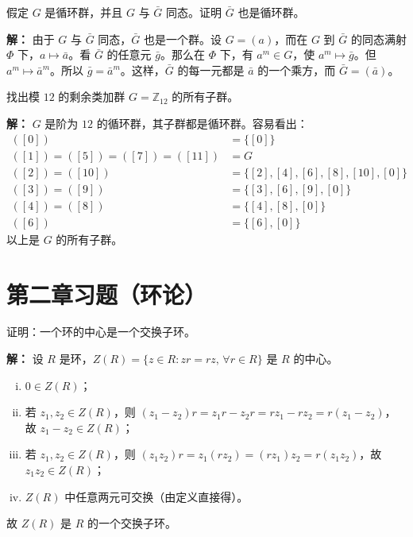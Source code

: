 \begin{example}[循环群的同态像也是循环群]
假定 $G$ 是循环群，并且 $G$ 与 $\bar{G}$ 同态。证明 $\bar{G}$ 也是循环群。

\textbf{解：} 由于 $G$ 与 $\bar{G}$ 同态，$\bar{G}$ 也是一个群。设 $G=(a)$，而在 $G$ 到 $\bar{G}$ 的同态满射 $\Phi$ 下，$a\longmapsto\bar{a}$。看 $\bar{G}$ 的任意元 $\bar{g}$。那么在 $\Phi$ 下，有 $a^m\in G$，使 $a^m\longmapsto\bar{g}$。但 $a^m\longmapsto\bar{a}^m$。所以 $\bar{g}=\bar{a}^m$。这样，$\bar{G}$ 的每一元都是 $\bar{a}$ 的一个乘方，而 $\bar{G}=(\bar{a})$。
\end{example}

\begin{example}[模 $12$ 的剩余类加群的所有子群]
找出模 $12$ 的剩余类加群 $G=\mathbb{Z}_{12}$ 的所有子群。

\textbf{解：} $G$ 是阶为 $12$ 的循环群，其子群都是循环群。容易看出：
\begin{align*}
([0])&=\{[0]\}\\
([1])=([5])=([7])=([11])&=G\\
([2])=([10])&=\{[2],[4],[6],[8],[10],[0]\}\\
([3])=([9])&=\{[3],[6],[9],[0]\}\\
([4])=([8])&=\{[4],[8],[0]\}\\
([6])&=\{[6],[0]\}
\end{align*}
以上是 $G$ 的所有子群。
\end{example}

\section{第二章习题（环论）}

\begin{example}[环的中心是交换子环]
证明：一个环的中心是一个交换子环。

\textbf{解：} 设 $R$ 是环，$Z(R)=\{z\in R:zr=rz,\,\forall r\in R\}$ 是 $R$ 的中心。
\begin{enumerate}[(i)]
  \item $0\in Z(R)$；
  \item 若 $z_1,z_2\in Z(R)$，则 $(z_1-z_2)r=z_1r-z_2r=rz_1-rz_2=r(z_1-z_2)$，故 $z_1-z_2\in Z(R)$；
  \item 若 $z_1,z_2\in Z(R)$，则 $(z_1z_2)r=z_1(rz_2)=(rz_1)z_2=r(z_1z_2)$，故 $z_1z_2\in Z(R)$；
  \item $Z(R)$ 中任意两元可交换（由定义直接得）。
\end{enumerate}
故 $Z(R)$ 是 $R$ 的一个交换子环。
\end{example}

